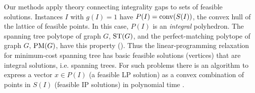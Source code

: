




Our methods apply theory connecting integrality gaps to sets of feasible solutions. Instances $I$ with $g(I)=1$ have $P(I)=\operatorname{conv}(S(I))$, the convex hull of the lattice of feasible points. In this case, $P(I)$ is an \textit{integral} polyhedron. The spanning tree polytope of graph $G$, $\operatorname{ST}(G)$, and the perfect-matching polytope of graph $G$, $\operatorname{{{PM}}}(G)$, have this property (\cite{Edmonds2003,edmondsPM}). Thus the linear-programming relaxation for minimum-cost spanning tree has basic feasible solutions (vertices) that are integral solutions, i.e. spanning trees. For such problems there is an algorithm to express a vector $x\in P(I)$ (a feasible LP solution) as a convex combination of points in $S(I)$ (feasible IP solutions) in polynomial time \cite{cons-cara}.


